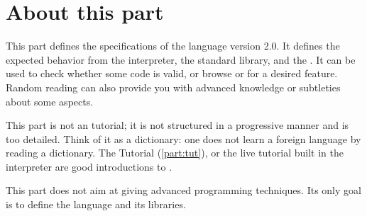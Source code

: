 \chapter*{About this part}

This part defines the specifications of the \us language version
2.0. It defines the expected behavior from the \us interpreter, the
standard library, and the \sdk. It can be used to check whether some
code is valid, or browse \us or \Cxx \api for a desired
feature. Random reading can also provide you with advanced knowledge
or subtleties about some \us aspects.

This part is not an \us tutorial; it is not structured in a
progressive manner and is too detailed.  Think of it as a dictionary:
one does not learn a foreign language by reading a dictionary. The \us
Tutorial (\autoref{part:tut}), or the live \us tutorial built in the
interpreter are good introductions to \us.

This part does not aim at giving advanced programming techniques. Its
only goal is to define the language and its libraries.







